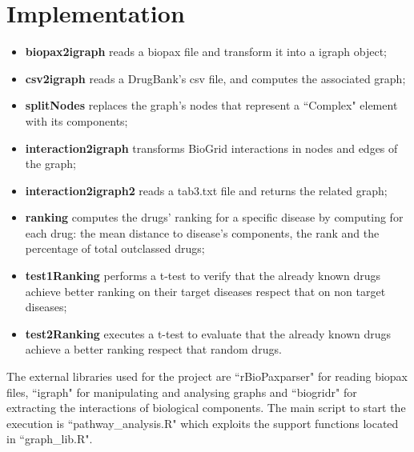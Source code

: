 \chapter{Implementation}\label{chap:implementation}

\begin{itemize}
    \item \textbf{biopax2igraph} reads a biopax file and transform it into a igraph object;
    \item \textbf{csv2igraph} reads a DrugBank's csv file, and computes the associated graph;
    \item \textbf{splitNodes} replaces the graph's nodes that represent a ``Complex" element with its components;
    \item \textbf{interaction2igraph} transforms BioGrid\cite{biogrid} interactions in nodes and edges of the graph;
    \item \textbf{interaction2igraph2} reads a tab3.txt file and returns the related graph;
    \item \textbf{ranking} computes the drugs' ranking for a specific disease by computing for each drug: the mean distance to disease's components, the rank and the percentage of total outclassed drugs;
    \item \textbf{test1Ranking} performs a t-test to verify that the already known drugs achieve better ranking on their target diseases respect that on non target diseases;
    \item \textbf{test2Ranking} executes a t-test to evaluate that the already known drugs achieve a better ranking respect that random drugs.
\end{itemize}

The external libraries used for the project are ``rBioPaxparser" for reading biopax files, ``igraph" for manipulating and analysing graphs and ``biogridr" for extracting the interactions of biological components. The main script to start the execution is ``pathway\_analysis.R" which exploits the support functions located in ``graph\_lib.R".